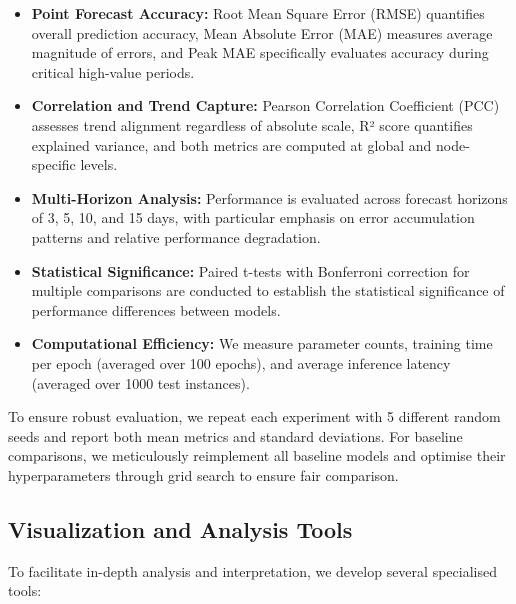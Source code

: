 \documentclass[lettersize, journal]{IEEEtran}
\begin{document}
\begin{itemize}
    \item \textbf{Point Forecast Accuracy:} Root Mean Square Error (RMSE) quantifies overall prediction accuracy, Mean Absolute Error (MAE) measures average magnitude of errors, and Peak MAE specifically evaluates accuracy during critical high-value periods.
    
    \item \textbf{Correlation and Trend Capture:} Pearson Correlation Coefficient (PCC) assesses trend alignment regardless of absolute scale, R² score quantifies explained variance, and both metrics are computed at global and node-specific levels.
    
    \item \textbf{Multi-Horizon Analysis:} Performance is evaluated across forecast horizons of 3, 5, 10, and 15 days, with particular emphasis on error accumulation patterns and relative performance degradation.
    
    \item \textbf{Statistical Significance:} Paired t-tests with Bonferroni correction for multiple comparisons are conducted to establish the statistical significance of performance differences between models.
    
    \item \textbf{Computational Efficiency:} We measure parameter counts, training time per epoch (averaged over 100 epochs), and average inference latency (averaged over 1000 test instances).
\end{itemize}

To ensure robust evaluation, we repeat each experiment with 5 different random seeds and report both mean metrics and standard deviations. For baseline comparisons, we meticulously reimplement all baseline models and optimise their hyperparameters through grid search to ensure fair comparison.

\subsection{Visualization and Analysis Tools}
To facilitate in-depth analysis and interpretation, we develop several specialised tools:
\end{document}
